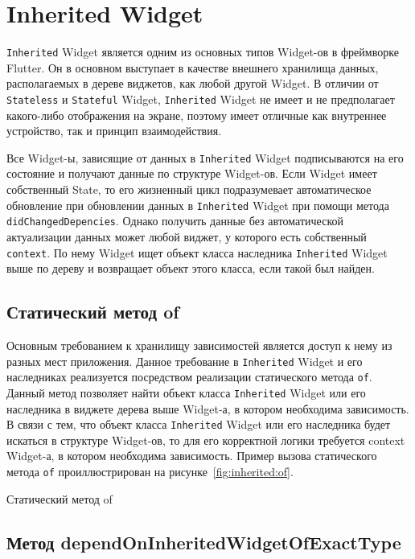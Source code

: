 \section{Inherited Widget}

\texttt{Inherited} Widget является одним
из основных типов Widget-ов в фреймворке Flutter.
Он в основном выступает в качестве внешнего хранилища данных,
располагаемых в дереве виджетов, как любой другой Widget.
В отличии от \texttt{Stateless} и \texttt{Stateful} Widget,
\texttt{Inherited} Widget не имеет
и не предполагает какого-либо отображения на экране,
поэтому имеет отличные как внутреннее устройство,
так и принцип взаимодействия.\par
Все Widget-ы, зависящие от данных в \texttt{Inherited} Widget
подписываются на его состояние и получают данные по структуре Widget-ов.
Если Widget имеет собственный State,
то его жизненный цикл подразумевает автоматическое обновление
при обновлении данных в \texttt{Inherited} Widget
при помощи метода \texttt{didChangedDepencies}.
Однако получить данные без автоматической актуализации данных
может любой виджет, у которого есть собственный \texttt{context}.
По нему Widget ищет объект класса наследника
\texttt{Inherited} Widget выше по дереву и возвращает объект этого класса,
если такой был найден.

\subsection{Статический метод of}

Основным требованием к хранилищу зависимостей является доступ
к нему из разных мест приложения.
Данное требование в \texttt{Inherited} Widget
и его наследниках реализуется посредством реализации
статического метода \texttt{of}.
Данный метод позволяет найти объект класса \texttt{Inherited} Widget
или его наследника в виджете дерева выше Widget-а,
в котором необходима зависимость.
В связи с тем, что объект класса \texttt{Inherited} Widget
или его наследника будет искаться в структуре Widget-ов,
то для его корректной логики требуется context Widget-а,
в котором необходима зависимость.
Пример вызова статического метода \texttt{of}
проиллюстрирован на рисунке~\ref{fig:inherited:of}.

\begin{image}
	\caption{Статический метод of}
	\label{fig:inherited:of}
\end{image}

\subsection{Метод dependOnInheritedWidgetOfExactType}

